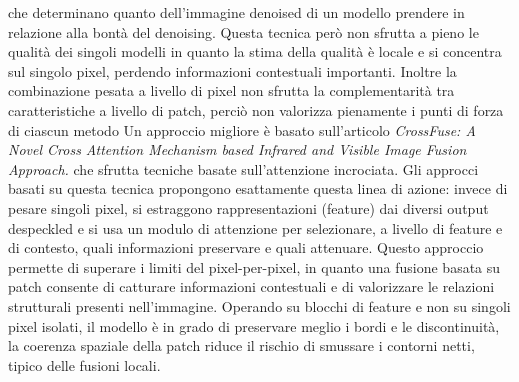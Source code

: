 che determinano quanto dell'immagine denoised di un  modello prendere in relazione alla bontà del denoising.
Questa tecnica però non sfrutta a pieno le qualità dei singoli modelli in quanto la stima della qualità è locale 
e si concentra sul singolo pixel, perdendo informazioni contestuali importanti. 
Inoltre la combinazione pesata a livello di pixel non sfrutta la complementarità tra caratteristiche a livello di 
patch, perciò non valorizza pienamente i punti di forza di ciascun metodo
Un approccio migliore è basato sull'articolo 
\textit{CrossFuse: A Novel Cross Attention Mechanism based Infrared and Visible Image Fusion Approach.} \cite{li2024crossfuse} che sfrutta tecniche basate sull'attenzione 
incrociata. Gli approcci basati su questa tecnica propongono esattamente questa linea di azione: 
invece di pesare singoli pixel, si estraggono rappresentazioni (feature) dai diversi output despeckled e si usa un modulo 
di attenzione per selezionare, a livello di feature e di contesto, quali informazioni preservare e quali attenuare. 
Questo approccio permette di superare i limiti del pixel-per-pixel, in quanto una fusione basata su patch consente 
di catturare informazioni contestuali e di valorizzare le relazioni strutturali presenti nell’immagine. Operando 
su blocchi di feature e non su singoli pixel isolati, il modello è in grado di preservare meglio i bordi e le 
discontinuità, la coerenza spaziale della patch riduce il rischio di smussare i contorni netti, tipico delle 
fusioni locali.